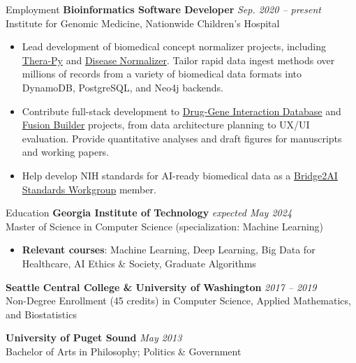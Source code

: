 \documentclass{cv} %
\begin{document}
\begin{rSection}{Employment}
{\bf Bioinformatics Software Developer} \hfill {\em Sep. 2020 -- present}\\
Institute for Genomic Medicine, Nationwide Children's Hospital
\vspace{-5pt}
\begin{itemize}[leftmargin=*,label=\raisebox{0.25ex}{\small$\bullet$}]
    \item Lead development of biomedical concept normalizer projects, including \href{https://github.com/cancervariants/therapy-normalization}{Thera-Py} and \href{https://github.com/cancervariants/disease-normalization}{Disease Normalizer}. Tailor rapid data ingest methods over millions of records from a variety of biomedical data formats into DynamoDB, PostgreSQL, and Neo4j backends.
    \item Contribute full-stack development to \href{https://dgidb.org}{Drug-Gene Interaction Database} and \href{http://fusion-builder.cancervariants.org/}{Fusion Builder} projects, from data architecture planning to UX/UI evaluation. Provide quantitative analyses and draft figures for manuscripts and working papers.
    \item Help develop NIH standards for AI-ready biomedical data as a \href{https://bridge2ai.org/standards-core/}{Bridge2AI Standards Workgroup} member.
\end{itemize}
\end{rSection}


\begin{rSection}{Education}
{\bf Georgia Institute of Technology} \hfill {\em expected May 2024}\\
Master of Science in Computer Science (specialization: Machine Learning)
\vspace{-5pt}
\begin{itemize}[leftmargin=12pt,topsep=0pt,label=\raisebox{0.25ex}{\tiny$\bullet$}]
    \item \small{\textbf{Relevant courses}: Machine Learning, Deep Learning, Big Data for Healthcare, AI Ethics \& Society, Graduate Algorithms}
\end{itemize}

{\bf Seattle Central College \& University of Washington} \hfill {\em 2017 -- 2019}\\
Non-Degree Enrollment (45 credits) in Computer Science, Applied Mathematics, and Biostatistics

{\bf University of Puget Sound} \hfill {\em May 2013}\\
Bachelor of Arts in Philosophy; Politics \& Government
\end{rSection}
\end{document}
